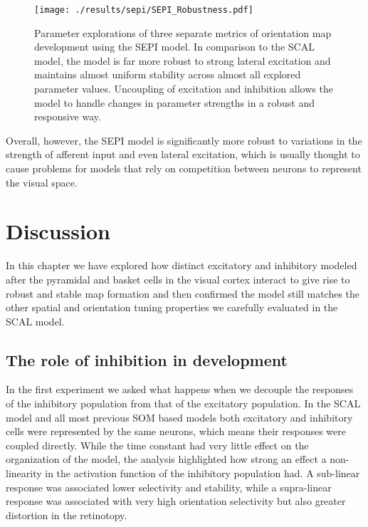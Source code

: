 \begin{figure}
	\centering
        \texttt{[image: ./results/sepi/SEPI\_Robustness.pdf]}
	\caption{Parameter explorations of three separate metrics of
          orientation map development using the SEPI model. In
          comparison to the SCAL model, the model is far more
          robust to strong lateral excitation and maintains almost
          uniform stability across almost all explored parameter
          values. Uncoupling of excitation and inhibition allows the
          model to handle changes in parameter strengths in a robust
          and responsive way.}
	\label{SEPIStability}
\end{figure}

Overall, however, the SEPI model is significantly more robust to
variations in the strength of afferent input and even lateral
excitation, which is usually thought to cause problems for models
that rely on competition between neurons to represent the visual
space.

\section{Discussion}

In this chapter we have explored how distinct excitatory and
inhibitory modeled after the pyramidal and basket cells in the visual
cortex interact to give rise to robust and stable map formation and
then confirmed the model still matches the other spatial and
orientation tuning properties we carefully evaluated in the SCAL
model.

\subsection{The role of inhibition in development}

In the first experiment we asked what happens when we decouple the
responses of the inhibitory population from that of the excitatory
population. In the SCAL model and all most previous SOM based models
both excitatory and inhibitory cells were represented by the same
neurons, which means their responses were coupled directly. While the
time constant had very little effect on the organization of the model,
the analysis highlighted how strong an effect a non-linearity in the
activation function of the inhibitory population had. A sub-linear
response was associated lower selectivity and stability, while a
supra-linear response was associated with very high orientation
selectivity but also greater distortion in the retinotopy.

